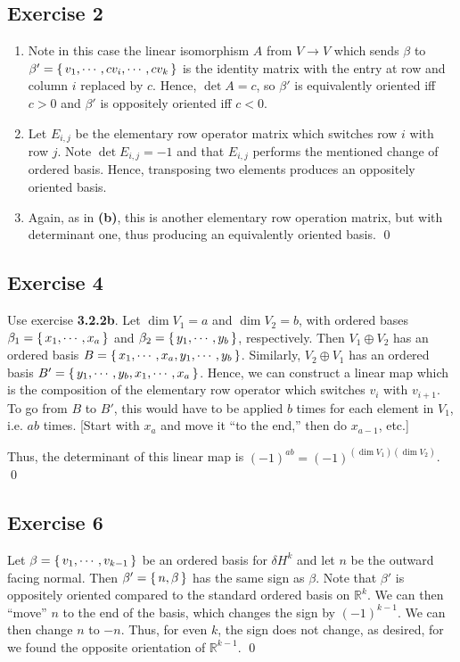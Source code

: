 \documentclass{article}
\newcommand{\R}{\mathbb{R}}
\begin{document}
  \subsection*{Exercise 2}
    \begin{enumerate}[label=\textbf{(\alph*)}]
      \item{
        Note in this case the linear isomorphism $A$ from $V\to V$ which sends
        $\beta$ to $\beta'=\set{v_1,\cdots,cv_i,\cdots,cv_k}$ is the identity
        matrix with the entry at row and column $i$ replaced by $c$. Hence,
        $\det A=c$, so $\beta'$ is equivalently oriented iff $c>0$ and $\beta'$
        is oppositely oriented iff $c<0$.
      }
      \item{
        Let $E_{i,j}$ be the elementary row operator matrix which switches row
        $i$ with row $j$. Note $\det E_{i,j}=-1$ and that $E_{i,j}$ performs the
        mentioned change of ordered basis. Hence, transposing two elements
        produces an oppositely oriented basis.
      }
      \item{
        Again, as in \textbf{(b)}, this is another elementary row operation
        matrix, but with determinant one, thus producing an equivalently
        oriented basis.
      }
      \qed
    \end{enumerate}

  \subsection*{Exercise 4}
    Use exercise \textbf{3.2.2b}. Let $\dim V_1=a$ and $\dim V_2=b$, with
    ordered bases $\beta_1=\set{x_1,\cdots,x_a}$ and $\beta_2=\set{y_1,\cdots,
    y_b}$, respectively. Then $V_1\oplus V_2$ has an ordered basis $B=\set{x_1,
    \cdots,x_a,y_1,\cdots,y_b}$. Similarly, $V_2\oplus V_1$ has an ordered basis
    $B'=\set{y_1,\cdots,y_b,x_1,\cdots,x_a}$. Hence, we can construct a linear
    map which is the composition of the elementary row operator which switches
    $v_i$ with $v_{i+1}$. To go from $B$ to $B'$, this would have to be applied
    $b$ times for each element in $V_1$, i.e. $ab$ times. [Start with $x_a$
    and move it ``to the end,'' then do $x_{a-1}$, etc.]

    Thus, the determinant of this linear map is $(-1)^{ab}=(-1)^{(\dim V_1)(\dim
    V_2)}$.
    \qed

  \subsection*{Exercise 6}
    Let $\beta=\set{v_1,\cdots,v_{k-1}}$ be an ordered basis for $\delta H^k$
    and let $n$ be the outward facing normal. Then $\beta'=\set{n,\beta}$ has
    the same sign as $\beta$. Note that $\beta'$ is oppositely oriented compared
    to the standard ordered basis on $\R^k$. We can then ``move'' $n$ to the end
    of the basis, which changes the sign by $(-1)^{k-1}$. We can then change $n$
    to $-n$. Thus, for even $k$, the sign does not change, as desired, for we
    found the opposite orientation of $\R^{k-1}$.
    \qed
\end{document}
